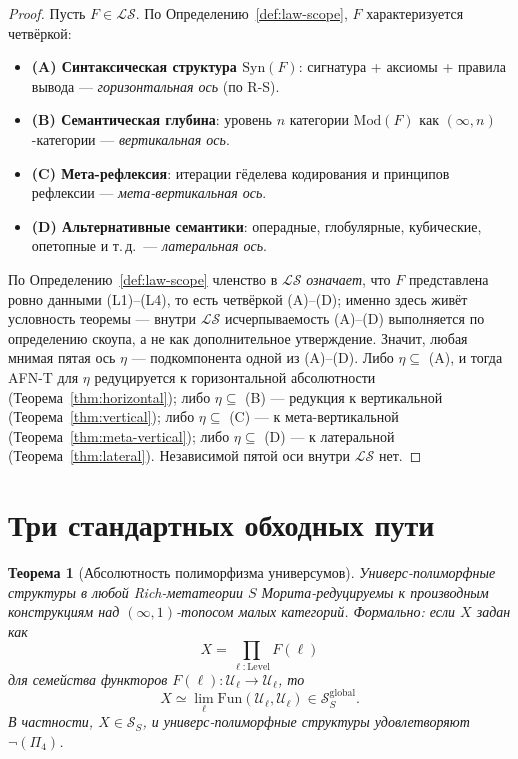 \documentclass[11pt]{article}
\theoremstyle{plain}
\newtheorem{theorem}{Теорема}[section]
\theoremstyle{definition}
\newcommand{\cS}{\mathcal{S}}
\newcommand{\cL}{\mathcal{L}}
\newcommand{\Fun}{\mathrm{Fun}}
\newcommand{\Syn}{\mathrm{Syn}}
\newcommand{\Mod}{\mathrm{Mod}}
\newcommand{\cU}{\mathcal{U}}
\begin{document}
\begin{proof}
Пусть $F \in \cL\cS$. По Определению~\ref{def:law-scope}, $F$ характеризуется четвёркой:
\begin{itemize}
\item \textbf{(A) Синтаксическая структура $\Syn(F)$}: сигнатура + аксиомы + правила вывода --- \emph{горизонтальная ось} (по R-S).
\item \textbf{(B) Семантическая глубина}: уровень $n$ категории $\Mod(F)$ как $(\infty, n)$-категории --- \emph{вертикальная ось}.
\item \textbf{(C) Мета-рефлексия}: итерации гёделева кодирования и принципов рефлексии --- \emph{мета-вертикальная ось}.
\item \textbf{(D) Альтернативные семантики}: операдные, глобулярные, кубические, опетопные и т.\,д.\ --- \emph{латеральная ось}.
\end{itemize}
По Определению~\ref{def:law-scope} членство в $\cL\cS$ \emph{означает}, что $F$ представлена ровно данными (L1)--(L4), то есть четвёркой (A)--(D); именно здесь живёт условность теоремы --- внутри $\cL\cS$ исчерпываемость (A)--(D) выполняется по определению скоупа, а не как дополнительное утверждение. Значит, любая мнимая пятая ось $\eta$ — подкомпонента одной из (A)--(D). Либо $\eta \subseteq$ (A), и тогда AFN-T для $\eta$ редуцируется к горизонтальной абсолютности (Теорема~\ref{thm:horizontal}); либо $\eta \subseteq$ (B) — редукция к вертикальной (Теорема~\ref{thm:vertical}); либо $\eta \subseteq$ (C) — к мета-вертикальной (Теорема~\ref{thm:meta-vertical}); либо $\eta \subseteq$ (D) — к латеральной (Теорема~\ref{thm:lateral}). Независимой пятой оси внутри $\cL\cS$ нет.
\end{proof}

\section{Три стандартных обходных пути}\label{sec:bypass}

\begin{theorem}[Абсолютность полиморфизма универсумов]\label{thm:universe}
Универс-полиморфные структуры в любой Rich-метатеории $S$ Морита-редуцируемы к производным конструкциям над $(\infty, 1)$-топосом малых категорий. Формально: если $X$ задан как
\[ X = \prod_{\ell : \mathrm{Level}} F(\ell) \]
для семейства функторов $F(\ell) : \cU_\ell \to \cU_\ell$, то
\[ X \simeq \lim_\ell \Fun(\cU_\ell, \cU_\ell) \in \cS_S^{\mathrm{global}}. \]
В частности, $X \in \cS_S$, и универс-полиморфные структуры удовлетворяют $\neg (\Pi_4)$.
\end{theorem}
\end{document}
